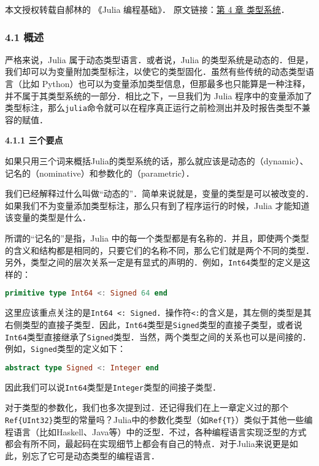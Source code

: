 
本文授权转载自郝林的 《Julia 编程基础》． 原文链接：\href{https://github.com/hyper0x/JuliaBasics/blob/master/book/ch04.md}{第 4 章 类型系统}．


\subsubsection{4.1 概述}

严格来说，Julia 属于动态类型语言．或者说，Julia 的类型系统是动态的．但是，我们却可以为变量附加类型标注，以使它的类型固化．虽然有些传统的动态类型语言（比如 Python）也可以为变量添加类型信息，但那最多也只能算是一种注释，并不属于其类型系统的一部分．相比之下，一旦我们为 Julia 程序中的变量添加了类型标注，那么\verb|julia|命令就可以在程序真正运行之前检测出并及时报告类型不兼容的赋值．

\textbf{4.1.1 三个要点}

如果只用三个词来概括Julia的类型系统的话，那么就应该是动态的（dynamic）、记名的（nominative）和参数化的（parametric）．

我们已经解释过什么叫做“动态的”．简单来说就是，变量的类型是可以被改变的．如果我们不为变量添加类型标注，那么只有到了程序运行的时候，Julia 才能知道该变量的类型是什么．

所谓的“记名的”是指，Julia 中的每一个类型都是有名称的．并且，即使两个类型的含义和结构都是相同的，只要它们的名称不同，那么它们就是两个不同的类型．另外，类型之间的层次关系一定是有显式的声明的．例如，\verb|Int64|类型的定义是这样的：

\begin{lstlisting}[language=julia]
primitive type Int64 <: Signed 64 end
\end{lstlisting}

这里应该重点关注的是\verb|Int64 <: Signed|．操作符\verb|<:|的含义是，其左侧的类型是其右侧类型的直接子类型．因此，\verb|Int64|类型是\verb|Signed|类型的直接子类型，或者说\verb|Int64|类型直接继承了\verb|Signed|类型．当然，两个类型之间的关系也可以是间接的．例如，\verb|Signed|类型的定义如下：

\begin{lstlisting}[language=julia]
abstract type Signed <: Integer end
\end{lstlisting}

因此我们可以说\verb|Int64|类型是\verb|Integer|类型的间接子类型．

对于类型的参数化，我们也多次提到过．还记得我们在上一章定义过的那个\verb|Ref{UInt32}|类型的常量吗？Julia中的参数化类型（如\verb|Ref{T}|）类似于其他一些编程语言（比如Haskell、Java等）中的泛型．不过，各种编程语言实现泛型的方式都会有所不同，最起码在实现细节上都会有自己的特点．对于Julia来说更是如此，别忘了它可是动态类型的编程语言．

